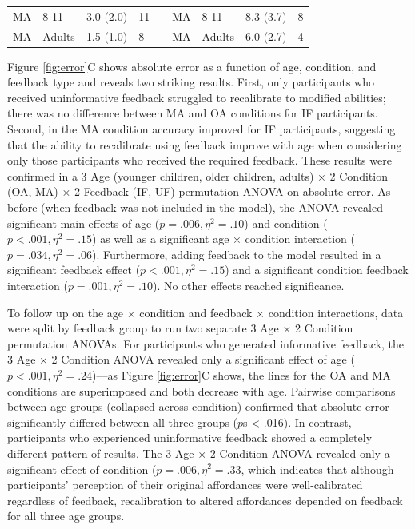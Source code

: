 \documentclass[a4paper,man,natbib,floatsintext,noextraspace]{apa6}
\begin{document}
\begin{table}
\begin{tabular}{@{}lllllllll@{}}
MA                              & 8-11                     & 3.0 (2.0)                            & 11                              &                       & MA                             & 8-11                     & 8.3 (3.7)                   & 8                      \\
MA                              & Adults                   & 1.5 (1.0)                            & 8                               &                       & MA                             & Adults                   & 6.0 (2.7)                   & 4                      \\ \bottomrule
\end{tabular}
\end{table}

Figure \ref{fig:error}C shows absolute error as a function of age, condition, and feedback type and reveals two striking results. First, only participants who received uninformative feedback struggled to recalibrate to modified abilities; there was no difference between MA and OA conditions for IF participants. Second, in the MA condition accuracy improved for IF participants, suggesting that the ability to recalibrate using feedback improve with age when considering only those participants who received the required feedback. These results were confirmed in a 3 Age (younger children, older children, adults) × 2 Condition (OA, MA) × 2 Feedback (IF, UF) permutation ANOVA on absolute error. As before (when feedback was not included in the model), the ANOVA revealed significant main effects of age ($p = .006, \eta^{2} = .10$) and condition ($p < .001, \eta^{2} = .15$) as well as a significant age × condition interaction ($p = .034, \eta^{2} = .06$). Furthermore, adding feedback to the model resulted in a significant feedback effect ($p < .001, \eta^{2} = .15$) and a significant condition feedback interaction ($p = .001, \eta^{2} = .10$). No other effects reached significance. 

To follow up on the age × condition and feedback × condition interactions, data were split by feedback group to run two separate 3 Age × 2 Condition permutation ANOVAs. For participants who generated informative feedback, the 3 Age × 2 Condition ANOVA revealed only a significant effect of age ($p < .001, \eta^{2} = .24$)---as Figure \ref{fig:error}C shows, the lines for the OA and MA conditions are superimposed and both decrease with age. Pairwise comparisons between age groups (collapsed across condition) confirmed that absolute error significantly differed between all three groups ($p$s < .016). In contrast, participants who experienced uninformative feedback showed a completely different pattern of results. The 3 Age × 2 Condition ANOVA revealed only a significant effect of condition ($p = .006, \eta^{2} = .33$, which indicates that although participants' perception of their original affordances were well-calibrated regardless of feedback, recalibration to altered affordances depended on feedback for all three age groups.
\end{document}
